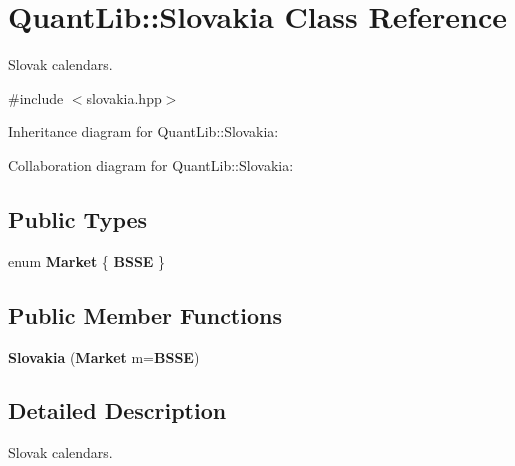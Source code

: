 \section{Quant\+Lib\+:\+:Slovakia Class Reference}
\label{class_quant_lib_1_1_slovakia}


Slovak calendars.  




{\ttfamily \#include $<$slovakia.\+hpp$>$}



Inheritance diagram for Quant\+Lib\+:\+:Slovakia\+:


Collaboration diagram for Quant\+Lib\+:\+:Slovakia\+:
\subsection*{Public Types}
\begin{DoxyCompactItemize}
\item 
enum {\bf Market} \{ {\bf B\+S\+SE}
 \}
\end{DoxyCompactItemize}
\subsection*{Public Member Functions}
\begin{DoxyCompactItemize}
\item 
{\bf Slovakia} ({\bf Market} m={\bf B\+S\+SE})
\end{DoxyCompactItemize}


\subsection{Detailed Description}
Slovak calendars. 

